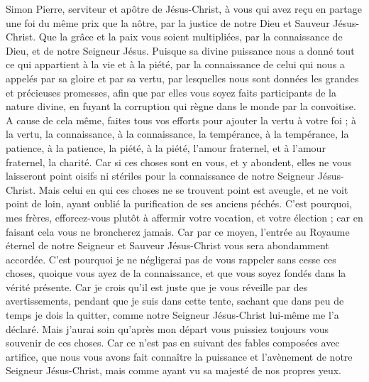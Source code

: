 \begin{multicols}{2}
\VerseOne{}Simon Pierre, serviteur et apôtre de Jésus-Christ, à vous qui avez reçu en partage une foi du même prix que la nôtre, par la justice de notre Dieu et Sauveur Jésus-Christ.
Que la grâce et la paix vous soient multipliées, par la connaissance de Dieu, et de notre Seigneur Jésus.
Puisque sa divine puissance nous a donné tout ce qui appartient à la vie et à la piété, par la connaissance de celui qui nous a appelés par sa gloire et par sa vertu,
par lesquelles nous sont données les grandes et précieuses promesses, afin que par elles vous soyez faits participants de la nature divine, en fuyant la corruption qui règne dans le monde par la convoitise.
A cause de cela même, faites tous vos efforts pour ajouter la vertu à votre foi ; à la vertu, la connaissance,
à la connaissance, la tempérance, à la tempérance, la patience, à la patience, la piété,
à la piété, l'amour fraternel, et à l'amour fraternel, la charité.
Car si ces choses sont en vous, et y abondent, elles ne vous laisseront point oisifs ni stériles pour la connaissance de notre Seigneur Jésus-Christ.
Mais celui en qui ces choses ne se trouvent point est aveugle, et ne voit point de loin, ayant oublié la purification de ses anciens péchés.
C'est pourquoi, mes frères, efforcez-vous plutôt à affermir votre vocation, et votre élection ; car en faisant cela vous ne broncherez jamais.
Car par ce moyen, l'entrée au Royaume éternel de notre Seigneur et Sauveur Jésus-Christ vous sera abondamment accordée.
C'est pourquoi je ne négligerai pas de vous rappeler sans cesse ces choses, quoique vous ayez de la connaissance, et que vous soyez fondés dans la vérité présente.
Car je crois qu'il est juste que je vous réveille par des avertissements, pendant que je suis dans cette tente,
sachant que dans peu de temps je dois la quitter, comme notre Seigneur Jésus-Christ lui-même me l'a déclaré.
Mais j'aurai soin qu’après mon départ vous puissiez toujours vous souvenir de ces choses.
Car ce n’est pas en suivant des fables composées avec artifice, que nous vous avons fait connaître la puissance et l’avènement de notre Seigneur Jésus-Christ, mais comme ayant vu sa majesté de nos propres yeux.

\end{multicols}

